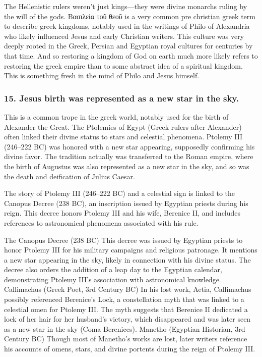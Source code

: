 The Hellenistic rulers weren't just kings---they were divine monarchs ruling by the will of the gods.
Βασιλεία τοῦ θεοῦ is a very common pre christian greek term to describe greek kingdoms, notably used in the writings of Philo of Alexandria who likely influenced Jesus and early Christian writers.
This culture was very deeply rooted in the Greek, Persian and Egyptian royal cultures for centuries by that time.
And so restoring a kingdom of God on earth much more likely refers to restoring the greek empire than to some abstract idea of a spiritual kingdom.
This is something fresh in the mind of Philo and Jesus himself.

\subsubsection{15.
Jesus birth was represented as a new star in the sky.}\label{par:jesus-birth-was-represented-as-a-new-star-in-the-sky.}

This is a common trope in the greek world, notably used for the birth of Alexander the Great.
The Ptolemies of Egypt (Greek rulers after Alexander) often linked their divine status to stars and celestial phenomena.
Ptolemy III (246--222 BC) was honored with a new star appearing, supposedly confirming his divine favor.
The tradition actually was transferred to the Roman empire, where the birth of Augustus was also represented as a new star in the sky, and so was the death and deification of Julius Caesar.

The story of Ptolemy III (246--222 BC) and a celestial sign is linked to the Canopus Decree (238 BC), an inscription issued by Egyptian priests during his reign.
This decree honors Ptolemy III and his wife, Berenice II, and includes references to astronomical phenomena associated with his rule.

The Canopus Decree (238 BC) This decree was issued by Egyptian priests to honor Ptolemy III for his military campaigns and religious patronage.
It mentions a new star appearing in the sky, likely in connection with his divine status.
The decree also orders the addition of a leap day to the Egyptian calendar, demonstrating Ptolemy III's association with astronomical knowledge.
Callimachus (Greek Poet, 3rd Century BC) In his lost work, Aetia, Callimachus possibly referenced Berenice's Lock, a constellation myth that was linked to a celestial omen for Ptolemy III.
The myth suggests that Berenice II dedicated a lock of her hair for her husband's victory, which disappeared and was later seen as a new star in the sky (Coma Berenices).
Manetho (Egyptian Historian, 3rd Century BC) Though most of Manetho's works are lost, later writers reference his accounts of omens, stars, and divine portents during the reign of Ptolemy III.

